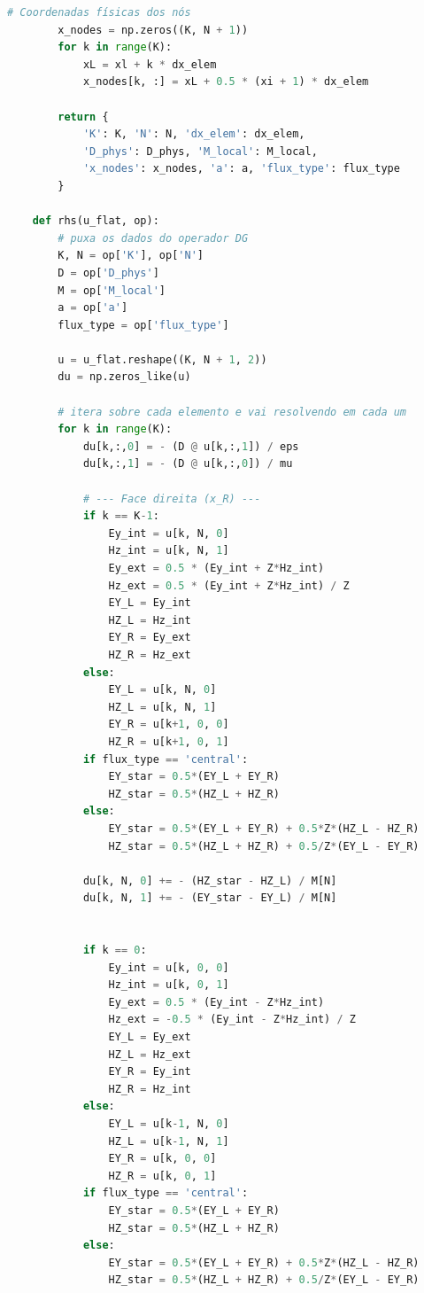 \begin{anexosenv}
\begin{lstlisting}[language=Python, breaklines=true, basicstyle=\tiny]
        # Coordenadas físicas dos nós
        x_nodes = np.zeros((K, N + 1))
        for k in range(K):
            xL = xl + k * dx_elem
            x_nodes[k, :] = xL + 0.5 * (xi + 1) * dx_elem
            
        return {
            'K': K, 'N': N, 'dx_elem': dx_elem,
            'D_phys': D_phys, 'M_local': M_local,
            'x_nodes': x_nodes, 'a': a, 'flux_type': flux_type
        }
        
    def rhs(u_flat, op):
        # puxa os dados do operador DG
        K, N = op['K'], op['N']
        D = op['D_phys']
        M = op['M_local']
        a = op['a']
        flux_type = op['flux_type']
        
        u = u_flat.reshape((K, N + 1, 2))
        du = np.zeros_like(u)
        
        # itera sobre cada elemento e vai resolvendo em cada um
        for k in range(K):
            du[k,:,0] = - (D @ u[k,:,1]) / eps
            du[k,:,1] = - (D @ u[k,:,0]) / mu
            
            # --- Face direita (x_R) ---
            if k == K-1: 
                Ey_int = u[k, N, 0]
                Hz_int = u[k, N, 1]
                Ey_ext = 0.5 * (Ey_int + Z*Hz_int)
                Hz_ext = 0.5 * (Ey_int + Z*Hz_int) / Z
                EY_L = Ey_int
                HZ_L = Hz_int
                EY_R = Ey_ext
                HZ_R = Hz_ext
            else:
                EY_L = u[k, N, 0]
                HZ_L = u[k, N, 1]
                EY_R = u[k+1, 0, 0]
                HZ_R = u[k+1, 0, 1]
            if flux_type == 'central':
                EY_star = 0.5*(EY_L + EY_R)
                HZ_star = 0.5*(HZ_L + HZ_R)
            else:
                EY_star = 0.5*(EY_L + EY_R) + 0.5*Z*(HZ_L - HZ_R)
                HZ_star = 0.5*(HZ_L + HZ_R) + 0.5/Z*(EY_L - EY_R)
                
            du[k, N, 0] += - (HZ_star - HZ_L) / M[N]
            du[k, N, 1] += - (EY_star - EY_L) / M[N]
        
        
            if k == 0:
                Ey_int = u[k, 0, 0]
                Hz_int = u[k, 0, 1]
                Ey_ext = 0.5 * (Ey_int - Z*Hz_int)
                Hz_ext = -0.5 * (Ey_int - Z*Hz_int) / Z 
                EY_L = Ey_ext
                HZ_L = Hz_ext
                EY_R = Ey_int
                HZ_R = Hz_int
            else:
                EY_L = u[k-1, N, 0]
                HZ_L = u[k-1, N, 1]
                EY_R = u[k, 0, 0]
                HZ_R = u[k, 0, 1]
            if flux_type == 'central':
                EY_star = 0.5*(EY_L + EY_R)
                HZ_star = 0.5*(HZ_L + HZ_R)
            else:
                EY_star = 0.5*(EY_L + EY_R) + 0.5*Z*(HZ_L - HZ_R)
                HZ_star = 0.5*(HZ_L + HZ_R) + 0.5/Z*(EY_L - EY_R)
            

\end{lstlisting}
\end{anexosenv}
